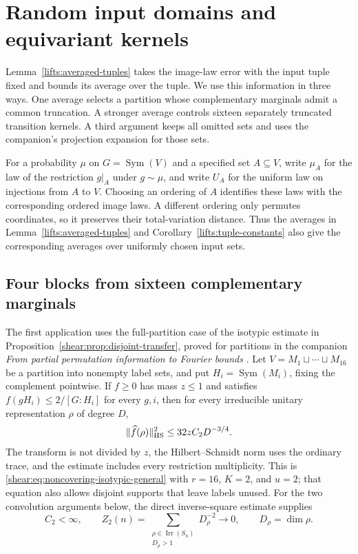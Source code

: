 \section{Random input domains and equivariant kernels}
\label{lifts:random-marginals}

Lemma~\ref{lifts:averaged-tuples} takes the image-law error with the
input tuple fixed and bounds its average over the tuple.
We use this information in three ways. One average selects a partition
whose complementary marginals admit a common truncation. A stronger
average controls sixteen separately truncated transition kernels. A
third argument keeps all omitted sets and uses the companion's
projection expansion for those sets.

For a probability $\mu$ on $G=\operatorname{Sym}(V)$ and a specified
set $A\subseteq V$, write $\mu_A$ for the law of the restriction
$g|_A$ under $g\sim\mu$, and write $U_A$ for the uniform law on
injections from $A$ to $V$. Choosing an ordering of $A$ identifies
these laws with the corresponding ordered image laws. A different
ordering only permutes coordinates, so it preserves their
total-variation distance. Thus the averages in
Lemma~\ref{lifts:averaged-tuples} and
Corollary~\ref{lifts:tuple-constants} also give the corresponding
averages over uniformly chosen input sets.

\subsection{Four blocks from sixteen complementary marginals}
\label{lifts:four-blocks-section}

The first application uses the full-partition case of the isotypic
estimate in Proposition~\ref{shear:prop:disjoint-transfer}, proved for
partitions in the companion \emph{From partial permutation information
to Fourier bounds} \cite[Proposition~]{partial-fourier}.
Let $V=M_1\sqcup\cdots\sqcup M_{16}$ be a partition into nonempty label
sets, and put $H_i=\operatorname{Sym}(M_i)$, fixing the complement
pointwise. If $f\ge0$ has mass $z\le1$ and satisfies
$f(gH_i)\le2/[G:H_i]$ for every $g,i$, then for every irreducible
unitary representation $\rho$ of degree $D$,
\begin{equation}
 \|\widehat f(\rho)\|_{\mathrm{HS}}^2
 \le32zC_2D^{-3/4}.
 \label{lifts:isotypic-input}
\end{equation}
The transform is not divided by $z$, the Hilbert--Schmidt norm uses
the ordinary trace, and the estimate includes every restriction
multiplicity. This is \eqref{shear:eq:noncovering-isotypic-general}
with $r=16$, $K=2$, and $u=2$; that equation also allows disjoint
supports that leave labels unused. For the two convolution arguments
below, the direct inverse-square
estimate \cite[Lemma~]{partial-fourier}
supplies
\begin{equation}
 C_2<\infty,\qquad
 Z_2(n)=\sum_{\substack{\rho\in\operatorname{Irr}(S_n)\\
                         D_\rho>1}}D_\rho^{-2}\longrightarrow0,
 \qquad D_\rho=\dim\rho.
 \label{lifts:inverse-square-input}
\end{equation}

